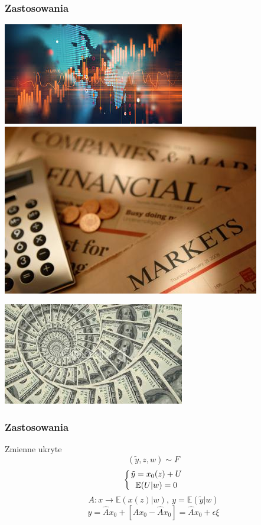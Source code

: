\documentclass{beamer}
\begin{document}
\begin{frame}\frametitle{Zastosowania}
\begin{center}
\includegraphics[scale=0.5]{d}
\includegraphics[scale=0.3]{e}
\end{center}
\begin{center}
\includegraphics[scale=0.5]{f}
\end{center}
\end{frame}

\begin{frame}\frametitle{Zastosowania}
\begin{block}{Zmienne ukryte}
\begin{displaymath}
(\tilde{y},z,w)\sim F
\end{displaymath}
\begin{displaymath}
\left\{{\tilde{y}=x_0(z)+U}\atop {\mathbb{E}(U|w)=0}\right.
\end{displaymath}
\begin{displaymath}
A\colon x\to \mathbb{E}(x(z)|w),\ y=\mathbb{E}(\tilde{y}|w)
\end{displaymath}
\begin{displaymath}
y=\hat{A}x_0+\left[Ax_0-\hat{A}x_0\right]=\hat{A}x_0+\epsilon\xi
\end{displaymath}
\end{block}
\end{frame}
\end{document}
